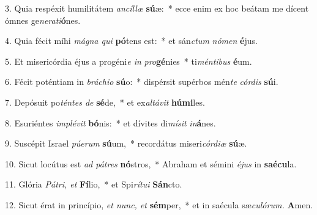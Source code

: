 \item 3. Quia respéxit humilitátem \textit{ancíllæ} \textbf{sú}æ:~* ecce enim ex hoc beátam me dícent ómnes ge\textit{nerati}\textbf{ó}nes.

\item 4. Quia fécit míhi \textit{mágna qui} \textbf{pó}tens est:~* et sán\textit{ctum} \textit{nómen} \textbf{é}jus.

\item 5. Et misericórdia éjus a progéni\textit{e in} \textit{pro}\textbf{gé}nies~* ti\textit{méntibus} \textbf{é}um.

\item 6. Fécit poténtiam in \textit{bráchio} \textbf{sú}o:~* dispérsit supérbos mén\textit{te} \textit{cór}\textit{dis} \textbf{sú}i.

\item 7. Depósuit po\textit{téntes de} \textbf{sé}de,~* et ex\textit{altávit} \textbf{húmi}les.

\item 8. Esuriéntes \textit{implévit} \textbf{bó}nis:~* et dívites di\textit{mísit} \textit{in}\textbf{á}nes.

\item 9. Suscépit Israel \textit{púerum} \textbf{sú}um,~* recordátus miseri\textit{córdiæ} \textbf{sú}æ.

\item 10. Sicut locútus est \textit{ad pátres} \textbf{nó}stros,~* Abraham et sémini \textit{éjus} in \textbf{saécu}la.

\item 11. Glória \textit{Pátri, et} \textbf{Fí}lio,~* et Spi\textit{rítui} \textbf{Sán}cto.

\item 12. Sicut érat in princípio, \textit{et nunc, et} \textbf{sém}per,~* et in saécula sæ\textit{culórum.} \textbf{A}men.